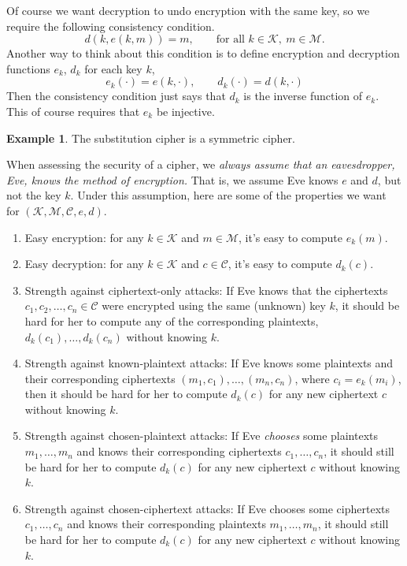 \documentclass[12pt]{article}
\theoremstyle{plain}
\theoremstyle{definition}
\newtheorem{example}[theorem]{Example}
\theoremstyle{remark}
\begin{document}
Of course we want decryption to undo encryption with the same key, so we require the following consistency condition.
\[
    d(k, e(k, m)) = m,\qquad \text{for all }k\in \mathcal{K},\ m\in \mathcal{M}.
\]
Another way to think about this condition is to define encryption and decryption functions $e_k$, $d_k$ for each key $k$,
\[
    e_k(\cdot) = e(k, \cdot),\qquad d_k(\cdot) = d(k, \cdot)
\]
Then the consistency condition just says that $d_k$ is the inverse function of $e_k$.
This of course requires that $e_k$ be injective.
\begin{example}
    The substitution cipher is a symmetric cipher.
\end{example}

When assessing the security of a cipher, we \emph{always assume that an eavesdropper, Eve, knows the method of encryption.}
That is, we assume Eve knows $e$ and $d$, but not the key $k$.
Under this assumption, here are some of the properties we want for $(\mathcal{K}, \mathcal{M}, \mathcal{C}, e, d)$.
\begin{enumerate}
    \item Easy encryption: for any $k\in \mathcal K$ and $m\in \mathcal M$, it's easy to compute $e_k(m)$.
    \item Easy decryption: for any $k\in \mathcal K$ and $c \in \mathcal C$, it's easy to compute $d_k(c)$.
    \item Strength against ciphertext-only attacks: If Eve knows that the ciphertexts $c_1, c_2, \ldots, c_n\in \mathcal C$ were encrypted using the same (unknown) key $k$, it should be hard for her to compute any of the corresponding plaintexts, $d_k(c_1), \ldots, d_k(c_n)$ without knowing $k$.

    \item Strength against known-plaintext attacks: If Eve knows some plaintexts and their corresponding ciphertexts $(m_1, c_1), \ldots, (m_n, c_n)$, where $c_i = e_k(m_i)$, then it should be hard for her to compute $d_k(c)$ for any new ciphertext $c$ without knowing $k$.

    \item Strength against chosen-plaintext attacks: If Eve \emph{chooses} some plaintexts $m_1, \ldots, m_n$ and knows their corresponding ciphertexts $c_1, \ldots, c_n$, it should still be hard for her to compute $d_k(c)$ for any new ciphertext $c$ without knowing $k$.

    \item Strength against chosen-ciphertext attacks: If Eve chooses some ciphertexts $c_1, \ldots, c_n$ and knows their corresponding plaintexts $m_1, \ldots, m_n$, it should still be hard for her to compute $d_k(c)$ for any new ciphertext $c$ without knowing $k$.
\end{enumerate}
\end{document}
